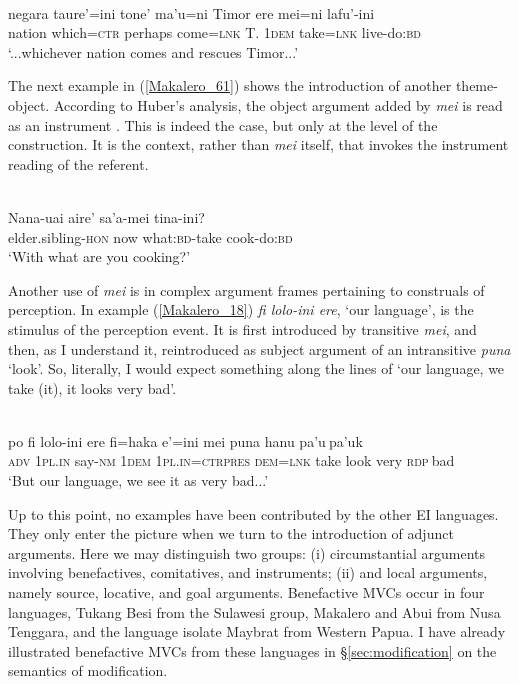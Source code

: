 \ea \label{Makalero_56}
\\
\gll negara taure’=ini tone’ ma’u=ni Timor ere mei=ni lafu’-ini \\
nation which=\textsc{ctr} perhaps come=\textsc{lnk} T. 1\textsc{dem} take=\textsc{lnk} live-do:\textsc{bd} \\
\glft `...whichever nation comes and rescues Timor...’\\ 
\z

The next example in (\ref{Makalero_61}) shows the introduction of another theme-object. According to Huber's analysis, the object argument added by \textit{mei} is read as an instrument \citep[204]{huber2011}. This is indeed the case, but only at the level of the construction. It is the context, rather than \textit{mei} itself, that invokes the instrument reading of the referent.

\ea \label{Makalero_61}
\\
\gll Nana-uai aire’ sa’a-mei tina-ini? \\
elder.sibling-\textsc{hon} now what:\textsc{bd}-take cook-do:\textsc{bd} \\
\glft ‘With what are you cooking?’\\ 
\z

Another use of \textit{mei} is in complex argument frames pertaining to construals of perception. In example (\ref{Makalero_18}) \textit{fi lolo-ini ere}, `our language', is the stimulus of the perception event. It is first introduced by transitive \textit{mei}, and then, as I understand it, reintroduced as subject argument of an intransitive \textit{puna} `look'. So, literally, I would expect something along the lines of `our language, we take (it), it looks very bad'.

\ea \label{Makalero_18}
\\
\gll po fi lolo-ini ere fi=haka e’=ini mei puna hanu pa’u$~$pa’uk \\
\textsc{adv} 1\textsc{pl}.\textsc{in} say-\textsc{nm} 1\textsc{dem} 1\textsc{pl}.\textsc{in}=\textsc{ctrpres} \textsc{dem}=\textsc{lnk} take look very \textsc{rdp}$~$bad \\
\glft ‘But our language, we see it as very bad...’\\ 
\z

Up to this point, no examples have been contributed by the other EI languages. They only enter the picture when we turn to the introduction of adjunct arguments. Here we may distinguish two groups: (i) circumstantial arguments involving benefactives, comitatives, and instruments; (ii) and local arguments, namely source, locative, and goal arguments. Benefactive MVCs occur in four languages, Tukang Besi from the Sulawesi group, Makalero and Abui from Nusa Tenggara, and the language isolate Maybrat from Western Papua. I have already illustrated benefactive MVCs from these languages in §\ref{sec:modification} on the semantics of modification.

